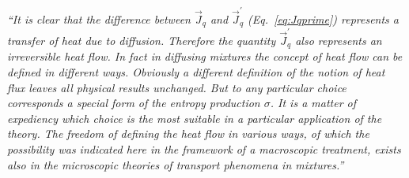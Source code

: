 \emph{``It is clear that the difference between $\vec{J}_q$ and $\vec{J}_q^\prime$ (Eq.~\ref{eq:Jqprime}) represents a transfer of heat due to diffusion. Therefore the quantity $\vec{J}_q^\prime$ also represents an irreversible heat flow. In fact in diffusing mixtures the concept of heat flow can be defined in different ways. Obviously a different definition of the notion of heat flux leaves all physical results unchanged. But to any particular choice corresponds a special form of the entropy production $\sigma$. It is a matter of expediency which choice is the most suitable in a particular application of the theory. The freedom of defining the heat flow in various ways, of which the possibility was indicated here in the framework of a macroscopic treatment, exists also in the microscopic theories of transport phenomena in mixtures.''}\\

